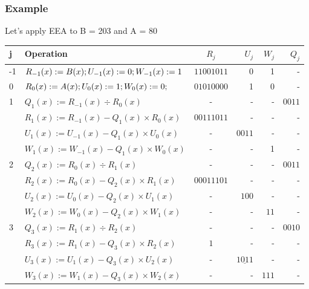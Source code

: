 \documentclass[12pt]{beamer}
\begin{document}
\begin{frame}
\frametitle{Example} 
\tiny
Let's apply EEA to B = 203  and A = 80
	\begin{center}
	\tiny
		\begin{tabular}{| l | p{4cm} | c | r | r | r |}
			\hline
			j & Operation & $R_{j}$ & $U_{j}$ & $W_{j}$ & $Q_{j}$ \\ \hline
			-1 & $R_{-1}(x) := B(x); \newline U_{-1}(x) := 0; W_{-1}(x) := 1$ & $11001011$ & 0 & 1 & - \\ \hline 
			0 & $R_{0}(x) := A(x); \newline U_{0}(x) := 1;  W_{0}(x) := 0;$ & $01010000$ & 1 & 0 & -\\ \hline
			1 & $Q_{1}(x) := R_{-1}(x) \div R_{0}(x)$ & - & - &  - & $0011$\\ 
			  & $R_{1}(x) := R_{-1}(x) - Q_{1}(x) \times R_{0}(x)$ & $00111011$& - & - & - \\
			  & $U_{1}(x) := U_{-1}(x) - Q_{1}(x) \times U_{0}(x)$ & - & $0011$ & - & -\\
			  & $W_{1}(x) := W_{-1}(x) - Q_{1}(x) \times W_{0}(x)$ & - & - & 1 & - \\ \hline
			2 & $Q_{2}(x) := R_{0}(x) \div R_{1}(x)$ & - & - &  - & $0011$\\ 
			  & $R_{2}(x) := R_{0}(x) - Q_{2}(x) \times R_{1}(x)$ & $00011101$& - & - & - \\
			  & $U_{2}(x) := U_{0}(x) - Q_{2}(x) \times U_{1}(x)$ & - & $100$ & - & -\\
			  & $W_{2}(x) := W_{0}(x) - Q_{2}(x) \times W_{1}(x)$ & - & - & $11$ & - \\ \hline			
 			3 & $Q_{3}(x) := R_{1}(x) \div R_{2}(x)$ & - & - &  - & $0010$\\ 
			  & $R_{3}(x) := R_{1}(x) - Q_{3}(x) \times R_{2}(x)$ & $1$& - & - & - \\
			  & $U_{3}(x) := U_{1}(x) - Q_{3}(x) \times U_{2}(x)$ & - & $\underline{1011}$ & - & -\\
			  & $W_{3}(x) := W_{1}(x) - Q_{3}(x) \times W_{2}(x)$ & - & - & $111$ & - \\ \hline	
		\end{tabular}
	\end{center}

\end{frame}
\end{document}
